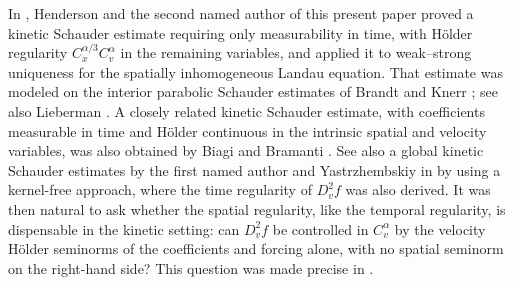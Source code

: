 \documentclass[11pt,reqno]{amsart}
\numberwithin{equation}{section}
\theoremstyle{remark}
\begin{document}
In \cite{HW}, Henderson and the second named author of this present paper proved a kinetic
Schauder estimate requiring only measurability in time, with H\"older
regularity \(C_x^{\alpha/3}C_v^\alpha\) in the remaining variables,
and applied it to weak--strong uniqueness for the spatially
inhomogeneous Landau equation.  That estimate was modeled on the
interior parabolic Schauder estimates of Brandt \cite{Brandt} and
Knerr \cite{Knerr}; see also Lieberman \cite{Lieberman}.  A closely
related kinetic Schauder estimate, with coefficients measurable in
time and H\"older continuous in the intrinsic spatial {and velocity} variables, was
also obtained by Biagi and Bramanti \cite{BiagiBramanti}.  {See also a global kinetic Schauder estimates by the first named author and Yastrzhembskiy in \cite{DongYastrzhembskiySchauder} by using a kernel-free approach, where the time regularity of $D_v^2 f$ was also derived.}
It was then natural to ask whether the spatial regularity, like the temporal
regularity, is dispensable in the kinetic setting: can \(D_v^2 f\) be
controlled in \(C_v^\alpha\) by the velocity H\"older seminorms of the
coefficients and forcing alone, with no spatial seminorm on the
right-hand side?  This question was made precise in \cite[Conjecture~1.3]{HW}.
\end{document}
